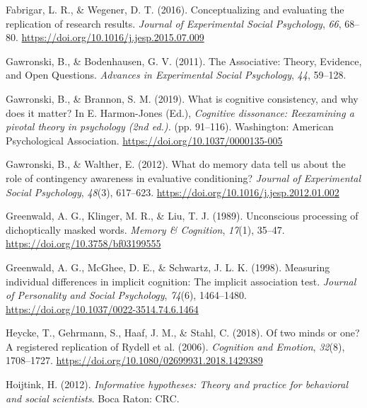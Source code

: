 \documentclass[
  man,floatsintext]{apa6}
\newlength{\cslhangindent}
\newlength{\cslentryspacingunit} %
\newenvironment{CSLReferences}[2] %
 {%
  \setlength{\parindent}{0pt}
  \ifodd #1
  \let\oldpar\par
  \def\par{\hangindent=\cslhangindent\oldpar}
  \fi
  \setlength{\parskip}{#2\cslentryspacingunit}
 }%
 {}
\begin{document}
\begin{CSLReferences}{1}{0}
\leavevmode{}%
Fabrigar, L. R., \& Wegener, D. T. (2016). Conceptualizing and evaluating the replication of research results. \emph{Journal of Experimental Social Psychology}, \emph{66}, 68--80. \url{https://doi.org/10.1016/j.jesp.2015.07.009}

\leavevmode{}%
Gawronski, B., \& Bodenhausen, G. V. (2011). The {Associative}: {Theory}, {Evidence}, and {Open Questions}. \emph{Advances in Experimental Social Psychology}, \emph{44}, 59--128.

\leavevmode{}%
Gawronski, B., \& Brannon, S. M. (2019). What is cognitive consistency, and why does it matter? In E. Harmon-Jones (Ed.), \emph{Cognitive dissonance: Reexamining a pivotal theory in psychology (2nd ed.).} (pp. 91--116). Washington: American Psychological Association. \url{https://doi.org/10.1037/0000135-005}

\leavevmode{}%
Gawronski, B., \& Walther, E. (2012). What do memory data tell us about the role of contingency awareness in evaluative conditioning? \emph{Journal of Experimental Social Psychology}, \emph{48}(3), 617--623. \url{https://doi.org/10.1016/j.jesp.2012.01.002}

\leavevmode{}%
Greenwald, A. G., Klinger, M. R., \& Liu, T. J. (1989). Unconscious processing of dichoptically masked words. \emph{Memory \& Cognition}, \emph{17}(1), 35--47. \url{https://doi.org/10.3758/bf03199555}

\leavevmode{}%
Greenwald, A. G., McGhee, D. E., \& Schwartz, J. L. K. (1998). Measuring individual differences in implicit cognition: The implicit association test. \emph{Journal of Personality and Social Psychology}, \emph{74}(6), 1464--1480. \url{https://doi.org/10.1037/0022-3514.74.6.1464}

\leavevmode{}%
Heycke, T., Gehrmann, S., Haaf, J. M., \& Stahl, C. (2018). Of two minds or one? {A} registered replication of {Rydell} et al. (2006). \emph{Cognition and Emotion}, \emph{32}(8), 1708--1727. \url{https://doi.org/10.1080/02699931.2018.1429389}

\leavevmode{}%
Hoijtink, H. (2012). \emph{Informative hypotheses: {Theory} and practice for behavioral and social scientists}. Boca Raton: {CRC}.


\end{CSLReferences}
\end{document}
